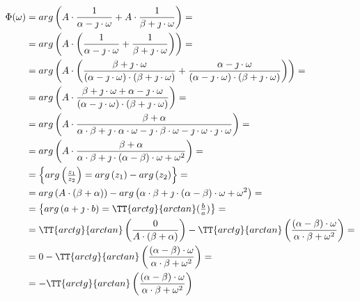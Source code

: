 \begin{task}
\begin{align*}
\Phi ( \omega )&=arg\left(A \cdot \frac{1}{\alpha -\jmath \cdot \omega }
+A \cdot \frac{1}{\beta +\jmath \cdot \omega } \right)=\\
&=arg\left(A \cdot \left( \frac{1}{\alpha -\jmath \cdot \omega }
+ \frac{1}{\beta +\jmath \cdot \omega }\right)\right)=\\
&=arg\left( A \cdot \left( \frac{\beta +\jmath \cdot \omega}{\left(\alpha -\jmath \cdot \omega \right) \cdot \left(\beta +\jmath \cdot \omega \right)}
+ \frac{\alpha -\jmath \cdot \omega}{\left(\alpha -\jmath \cdot \omega \right) \cdot \left(\beta +\jmath \cdot \omega \right) }\right)\right)=\\
&=arg\left(A \cdot \frac{\beta +\jmath \cdot \omega + \alpha -\jmath \cdot \omega}{\left(\alpha -\jmath \cdot \omega \right) \cdot \left(\beta +\jmath \cdot \omega \right)}\right)=\\
&=arg\left( A \cdot \frac{\beta + \alpha}{ \alpha \cdot \beta + \jmath \cdot \alpha \cdot \omega - \jmath \cdot \beta \cdot \omega - \jmath \cdot \omega \cdot \jmath \cdot \omega} \right)=\\
&=arg\left( A \cdot \frac{\beta + \alpha}{ \alpha \cdot \beta + \jmath \cdot\left( \alpha - \beta \right)\cdot \omega + \omega^2} \right)=\\
&=\begin{Bmatrix}
arg\left(\frac{z_1}{z_2}\right) = arg\left(z_1\right) -arg\left(z_2\right)
\end{Bmatrix}=\\
&=arg\left(  A \cdot \left(\beta + \alpha\right)\right) - arg\left(\alpha \cdot \beta + \jmath \cdot\left( \alpha - \beta \right)\cdot \omega + \omega^2 \right)=\\
&=\begin{Bmatrix}
arg\left(a + \jmath \cdot b\right) = \TT{arctg}{arctan}(\frac{b}{a})\\
\end{Bmatrix}=\\
&=\TT{arctg}{arctan}\left(\frac{0}{ A \cdot \left(\beta + \alpha\right)}\right) - \TT{arctg}{arctan}\left(\frac{\left( \alpha - \beta \right)\cdot \omega}{\alpha \cdot \beta+ \omega^2}\right)=\\
&=0 - \TT{arctg}{arctan}\left(\frac{\left( \alpha - \beta \right)\cdot \omega}{\alpha \cdot \beta+ \omega^2}\right)=\\
&= - \TT{arctg}{arctan}\left(\frac{\left( \alpha - \beta \right)\cdot \omega}{\alpha \cdot \beta+ \omega^2}\right)
\end{align*}


\end{task}
